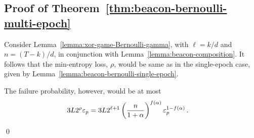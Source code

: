 \subsection*{Proof of Theorem~\ref{thm:beacon-bernoulli-multi-epoch}}
  Consider Lemma~\ref{lemma:xor-game-Bernoulli-gamma}, 
  with $\ell = k/d$ and $n = (T-k)/d$, 
  in conjunction with Lemma~\ref{lemma:beacon-composition}.
  It follows that the min-entropy loss, $\rho$, 
  would be same as in the single-epoch case, 
  given by Lemma~\ref{lemma:beacon-bernoulli-single-epoch}.

  The failure probability, however, would be at most
  \begin{align*}
    3 L 2^\rho \mathsf{\varepsilon}_p
    &= 3 L 2^{\ell + 1} 
      \left(\frac{n}{1+\alpha}\right)^{f(\alpha)} 
      \mathsf{\varepsilon}_p^{1 - f(\alpha)}
      \,.
  \end{align*}
  
\hfill\qed